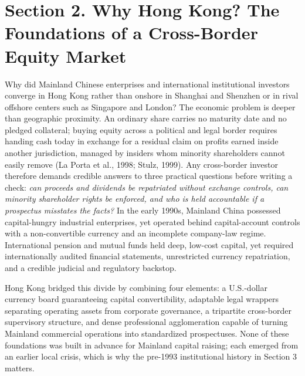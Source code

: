 \documentclass[11pt,letterpaper]{article}
\begin{document}
\section*{\texorpdfstring{Section 2. Why Hong Kong? The Foundations of a Cross-Border Equity Market}{Section 2. Why Hong Kong? The Foundations of a Cross-Border Equity Market}}
Why did Mainland Chinese enterprises and international institutional investors converge in Hong Kong rather than onshore in Shanghai and Shenzhen or in rival offshore centers such as Singapore and London? The economic problem is deeper than geographic proximity. An ordinary share carries no maturity date and no pledged collateral; buying equity across a political and legal border requires handing cash today in exchange for a residual claim on profits earned inside another jurisdiction, managed by insiders whom minority shareholders cannot easily remove (La Porta et al., 1998; Stulz, 1999). Any cross-border investor therefore demands credible answers to three practical questions before writing a check: \textit{can proceeds and dividends be repatriated without exchange controls, can minority shareholder rights be enforced, and who is held accountable if a prospectus misstates the facts?} In the early 1990s, Mainland China possessed capital-hungry industrial enterprises, yet operated behind capital-account controls with a non-convertible currency and an incomplete company-law regime. International pension and mutual funds held deep, low-cost capital, yet required internationally audited financial statements, unrestricted currency repatriation, and a credible judicial and regulatory backstop.

Hong Kong bridged this divide by combining four elements: a U.S.-dollar currency board guaranteeing capital convertibility, adaptable legal wrappers separating operating assets from corporate governance, a tripartite cross-border supervisory structure, and dense professional agglomeration capable of turning Mainland commercial operations into standardized prospectuses. None of these foundations was built in advance for Mainland capital raising; each emerged from an earlier local crisis, which is why the pre-1993 institutional history in Section 3 matters.
\end{document}
